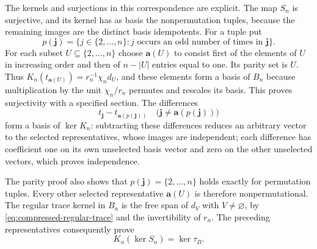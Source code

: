 The kernels and surjections in this correspondence are explicit.
The map $S_n$ is surjective, and its kernel has as basis the
nonpermutation tuples, because the remaining images are the
distinct basis idempotents. For a tuple put
\[
 p(\boldsymbol j)=\{j\in\{2,\ldots,n\}:
            j\text{ occurs an odd number of times in }\boldsymbol j\}.
\]
For each subset $U\subseteq\{2,\ldots,n\}$ choose
$\boldsymbol a(U)$ to consist first of the elements of $U$ in
increasing order and then of $n-|U|$ entries equal to one.
Its parity set is $U$. Thus
$K_n(t_{\boldsymbol a(U)})=r_n^{-1}\chi_nd_U$,
and these elements form a basis of $B_n$ because multiplication
by the unit $\chi_n/r_n$ permutes and rescales its basis.
This proves surjectivity with a specified section. The differences
\[
 t_{\boldsymbol j}-t_{\boldsymbol a(p(\boldsymbol j))}
 \quad\bigl(\boldsymbol j\ne\boldsymbol a(p(\boldsymbol j))\bigr)
\]
form a basis of $\ker K_n$: subtracting these differences reduces
an arbitrary vector to the selected representatives, whose images
are independent; each difference has coefficient one on its own
unselected basis vector and zero on the other unselected vectors,
which proves independence.

The parity proof also shows that $p(\boldsymbol j)=\{2,\ldots,n\}$
holds exactly for permutation tuples. Every other selected representative
$\boldsymbol a(U)$ is therefore nonpermutational. The regular trace
kernel in $B_n$ is the free span of $d_V$ with $V\ne\varnothing$,
by \eqref{eq:compressed-regular-trace} and the invertibility of $r_n$.
The preceding representatives consequently prove
\begin{equation}\label{eq:compressed-kernel-trace}
 K_n(\ker S_n)=\ker\tau_B.
\end{equation}

